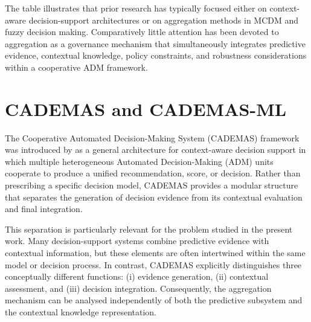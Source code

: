 \documentclass[mathematics,article,submit,moreauthors]{Definitions/mdpi}
\begin{document}
The table illustrates that prior research has typically focused either
on context-aware decision-support architectures or on aggregation
methods in MCDM and fuzzy decision making. Comparatively little
attention has been devoted to aggregation as a governance mechanism that
simultaneously integrates predictive evidence, contextual knowledge,
policy constraints, and robustness considerations within a cooperative
ADM framework.










\section{CADEMAS and CADEMAS-ML}
\label{sect:cademas}

The Cooperative Automated Decision-Making System (CADEMAS) framework
was introduced by \citet{NovoaHernandez2026} as a general architecture
for context-aware decision support in which multiple heterogeneous
Automated Decision-Making (ADM) units cooperate to produce a unified
recommendation, score, or decision. Rather than prescribing a specific
decision model, CADEMAS provides a modular structure that separates the
generation of decision evidence from its contextual evaluation and final
integration.

This separation is particularly relevant for the problem studied in the
present work. Many decision-support systems combine predictive evidence
with contextual information, but these elements are often intertwined
within the same model or decision process. In contrast, CADEMAS
explicitly distinguishes three conceptually different functions:
(i) evidence generation, (ii) contextual assessment, and
(iii) decision integration. Consequently, the aggregation mechanism can
be analysed independently of both the predictive subsystem and the
contextual knowledge representation.
\end{document}
